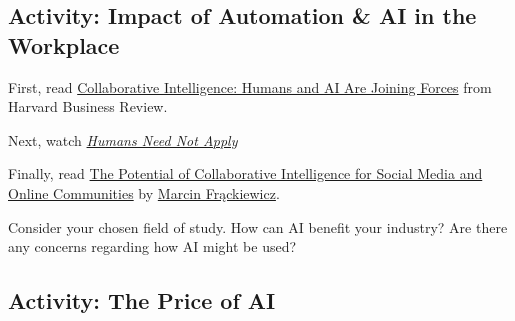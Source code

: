 \documentclass[
]{book}
\theoremstyle{definition}
\theoremstyle{definition}
\theoremstyle{definition}
\theoremstyle{definition}
\theoremstyle{remark}
\begin{document}
\hypertarget{activity-impact-of-automation-ai-in-the-workplace}{%
\subsection*{Activity: Impact of Automation \& AI in the Workplace}\label{activity-impact-of-automation-ai-in-the-workplace}}

\begin{reflect}
First, read \href{https://hbr.org/2018/07/collaborative-intelligence-humans-and-ai-are-joining-forces}{Collaborative Intelligence: Humans and AI Are Joining Forces} from Harvard Business Review.

Next, watch \href{https://www.youtube.com/watch?v=7Pq-S557XQU}{\emph{Humans Need Not Apply}}

Finally, read \href{https://ts2.space/en/the-potential-of-collaborative-intelligence-for-social-media-and-online-communities/}{The Potential of Collaborative Intelligence for Social Media and Online Communities} by \href{https://ts2.space/en/author/marcin/}{Marcin Frąckiewicz}.

Consider your chosen field of study. How can AI benefit your industry? Are there any concerns regarding how AI might be used?
\end{reflect}

\hypertarget{activity-the-price-of-ai}{%
\subsection*{Activity: The Price of AI}\label{activity-the-price-of-ai}}
\end{document}
